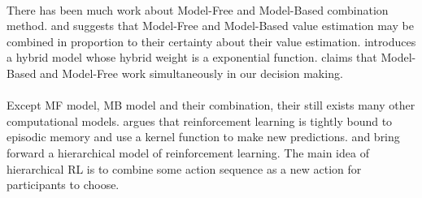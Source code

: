 \paragraph{}
There has been much work about Model-Free and Model-Based combination method. \citet{daw2005uncertainty} and \citet{doya2002multiple} suggests that Model-Free and Model-Based value estimation may be combined in proportion to their certainty about their value estimation. \citet{glascher2010states} introduces a hybrid model whose hybrid weight is a exponential function. \citet{daw2011model} claims that Model-Based and Model-Free work simultaneously in our decision making. 

\paragraph{}
Except MF model, MB model and their combination, their still exists many other computational models. \citet{gershman2017reinforcement} argues that reinforcement learning is tightly bound to episodic memory and use a kernel function to make new predictions. \citet{botvinick2015reinforcement} and \citet{botvinick2012hierarchical} bring forward a hierarchical model of reinforcement learning. The main idea of hierarchical RL is to combine some action sequence as a new action for participants to choose. 







